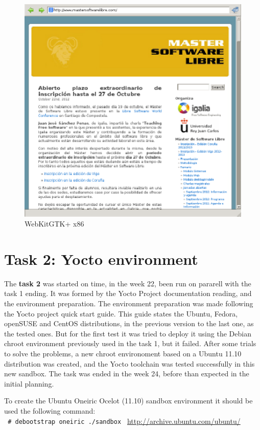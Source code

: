 \documentclass[a4paper,11pt,openany]{report}
\begin{document}
\begin{figure}[hbtp]
\centering
\includegraphics[scale=1]{webkit_x86.eps}
\caption{WebKitGTK+ x86}
\end{figure}

\section{Task 2: Yocto environment}
The \textbf{task 2} was started on time, in the week 22, been run on pararell with the task 1 ending. It was formed by the Yocto Project documentation reading, and the environment preparation.
The environment preparation was made following the Yocto project quick start guide\cite{yocto quick start}. This guide states the Ubuntu, Fedora, openSUSE and CentOS distributions, in the previous version to the last one, as the tested ones. But for the first test it was tried to deploy it using the Debian chroot environment previously used in the task 1, but it failed. After some trials to solve the problems, a new chroot environoment based on a Ubuntu 11.10 distribution was created, and the Yocto toolchain was tested successfully in this new sandbox. The task was ended in the week 24, before than expected in the initial planning.

To create the Ubuntu Oneiric Ocelot (11.10) sandbox environment it should be used the following command:\\
\verb$ # debootstrap oneiric ./sandbox $ \url{http://archive.ubuntu.com/ubuntu/}\\
\end{document}
